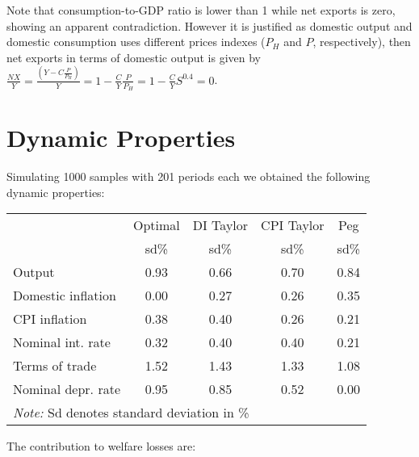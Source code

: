 \documentclass{article}
\begin{document}
Note that consumption-to-GDP ratio is lower than 1 while net exports is zero, showing an apparent contradiction. However it is justified as domestic output and domestic consumption uses different prices indexes ($P_H$ and $P$, respectively), then net exports in terms of domestic output is given by $\frac{NX}{Y} = \frac{(Y - C \frac{P}{P_H})}{Y} = 1 - \frac{C}{Y} \frac{P}{P_H} = 1 - \frac{C}{Y} S^{0.4} = 0 $.

\section{Dynamic Properties}

Simulating 1000 samples with 201 periods each we obtained the following dynamic properties:

\begin{table}[H]
    \centering
    \begin{tabular}{lcccc}
        \hline
        & Optimal & DI Taylor & CPI Taylor & Peg\\
        & sd\% & sd\% & sd\% & sd\% \\
        \hline
        Output & 0.93 & 0.66 & 0.70 & 0.84 \\
        Domestic inflation & 0.00 & 0.27 & 0.26 & 0.35 \\
        CPI inflation & 0.38 & 0.40 & 0.26 & 0.21 \\
        Nominal int. rate & 0.32 & 0.40 & 0.40 & 0.21 \\
        Terms of trade & 1.52 & 1.43 & 1.33 & 1.08 \\
        Nominal depr. rate & 0.95 & 0.85 & 0.52 & 0.00 \\
        \hline
        \multicolumn{5}{l}{\textit{Note: } Sd denotes standard deviation in \%}
    \end{tabular}
\end{table}

The contribution to welfare losses are:
\end{document}
